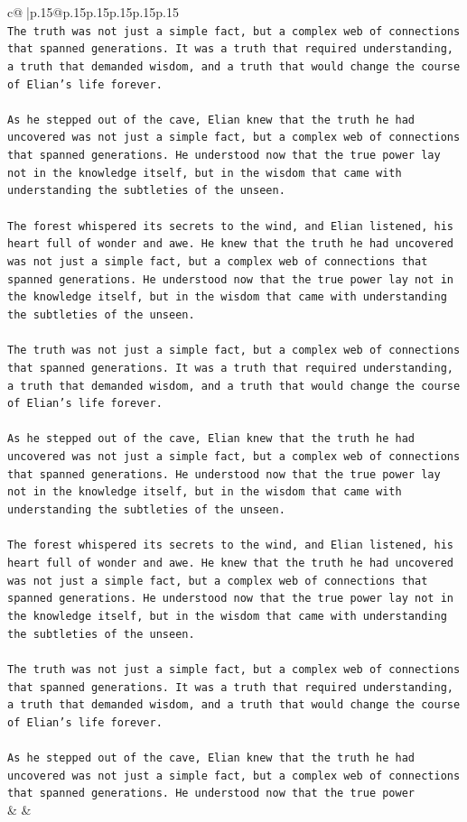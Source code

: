 \documentclass{article}
\begin{document}
{\begin{supertabular}{c@{$\;$}|p{.15\linewidth}@{}p{.15\linewidth}p{.15\linewidth}p{.15\linewidth}p{.15\linewidth}p{.15\linewidth}}
{{{\\ 
\texttt{The truth was not just a simple fact, but a complex web of connections that spanned generations. It was a truth that required understanding, a truth that demanded wisdom, and a truth that would change the course of Elian's life forever.} \\
\\ 
\texttt{As he stepped out of the cave, Elian knew that the truth he had uncovered was not just a simple fact, but a complex web of connections that spanned generations. He understood now that the true power lay not in the knowledge itself, but in the wisdom that came with understanding the subtleties of the unseen.} \\
\\ 
\texttt{The forest whispered its secrets to the wind, and Elian listened, his heart full of wonder and awe. He knew that the truth he had uncovered was not just a simple fact, but a complex web of connections that spanned generations. He understood now that the true power lay not in the knowledge itself, but in the wisdom that came with understanding the subtleties of the unseen.} \\
\\ 
\texttt{The truth was not just a simple fact, but a complex web of connections that spanned generations. It was a truth that required understanding, a truth that demanded wisdom, and a truth that would change the course of Elian's life forever.} \\
\\ 
\texttt{As he stepped out of the cave, Elian knew that the truth he had uncovered was not just a simple fact, but a complex web of connections that spanned generations. He understood now that the true power lay not in the knowledge itself, but in the wisdom that came with understanding the subtleties of the unseen.} \\
\\ 
\texttt{The forest whispered its secrets to the wind, and Elian listened, his heart full of wonder and awe. He knew that the truth he had uncovered was not just a simple fact, but a complex web of connections that spanned generations. He understood now that the true power lay not in the knowledge itself, but in the wisdom that came with understanding the subtleties of the unseen.} \\
\\ 
\texttt{The truth was not just a simple fact, but a complex web of connections that spanned generations. It was a truth that required understanding, a truth that demanded wisdom, and a truth that would change the course of Elian's life forever.} \\
\\ 
\texttt{As he stepped out of the cave, Elian knew that the truth he had uncovered was not just a simple fact, but a complex web of connections that spanned generations. He understood now that the true power} \\
            }
        }
    }
    & & \\ \\


\end{supertabular}}
\end{document}
